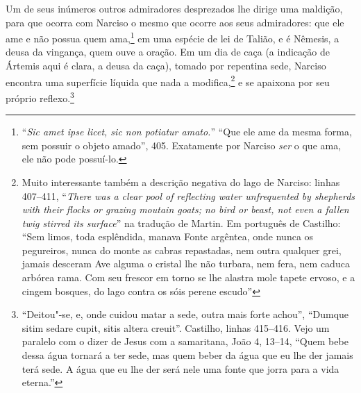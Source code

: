 Um de seus inúmeros outros admiradores desprezados lhe dirige uma
maldição, para que ocorra com Narciso o mesmo que ocorre aos seus
admiradores: que ele ame e não possua quem ama,\footnote{ “\emph{Sic amet
ipse licet, sic non potiatur amato.}” “Que ele ame da mesma forma, sem
possuir o objeto amado”, 405. Exatamente por Narciso \emph{ser} o
que ama, ele não pode possuí-lo.} em uma espécie de lei de Talião, e
é Nêmesis, a deusa da vingança, quem ouve a oração. Em um dia de caça
(a indicação de Ártemis aqui é clara, a deusa da caça), tomado por
repentina sede, Narciso encontra uma superfície líquida que nada a
modifica,\footnote{ Muito interessante também a descrição negativa do
lago de Narciso: linhas 407--411, “\emph{There was a clear pool of
reflecting water unfrequented by shepherds with their flocks or
grazing moutain goats; no bird or beast, not even a fallen twig
stirred its surface}” na tradução de Martin. Em português de Castilho:
“Sem limos, toda esplêndida, manava Fonte argêntea, onde nunca os
pegureiros, nunca do monte as cabras repastadas, nem outra qualquer
grei, jamais desceram Ave alguma o cristal lhe não turbara, nem fera,
nem caduca arbórea rama. Com seu frescor em torno se lhe alastra mole
tapete ervoso, e a cingem bosques, do lago contra os sóis perene
escudo”} e se apaixona por seu próprio reflexo.\footnote{ “Deitou"-se,
e, onde cuidou matar a sede, outra mais forte achou”, “Dumque
sitim sedare cupit, sitis altera creuit”. Castilho, linhas 415--416.
Vejo um paralelo com o dizer de Jesus com a samaritana, João 4,
13--14, “Quem bebe dessa água tornará a ter sede, mas quem beber da
água que eu lhe der jamais terá sede. A água que eu lhe der será nele
uma fonte que jorra para a vida eterna.”} 

